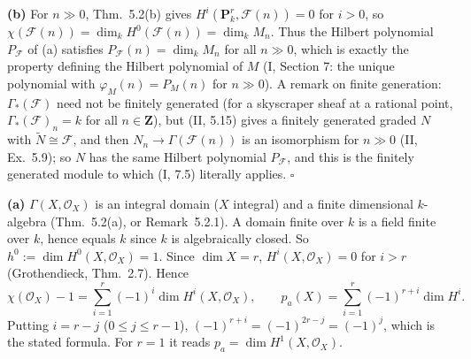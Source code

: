 \documentclass[11pt]{article}
\begin{document}
\textbf{(b)} For $n\gg0$, Thm.~5.2(b) gives $H^i(\mathbf P^r_k,\mathcal F(n))=0$ for $i>0$, so $\chi(\mathcal F(n))=\dim_kH^0(\mathcal F(n))=\dim_kM_n$. Thus the Hilbert polynomial $P_{\mathcal F}$ of (a) satisfies $P_{\mathcal F}(n)=\dim_kM_n$ for all $n\gg0$, which is exactly the property defining the Hilbert polynomial of $M$ (I, Section 7: the unique polynomial with $\varphi_M(n)=P_M(n)$ for $n\gg0$). A remark on finite generation: $\Gamma_*(\mathcal F)$ need not be finitely generated (for a skyscraper sheaf at a rational point, $\Gamma_*(\mathcal F)_n=k$ for all $n\in\mathbf Z$), but (II, 5.15) gives a finitely generated graded $N$ with $\tilde N\cong\mathcal F$, and then $N_n\to\Gamma(\mathcal F(n))$ is an isomorphism for $n\gg0$ (II, Ex.~5.9); so $N$ has the same Hilbert polynomial $P_{\mathcal F}$, and this is the finitely generated module to which (I, 7.5) literally applies. \hfill$\square$

\pf
\textbf{(a)} $\Gamma(X,\mathcal O_X)$ is an integral domain ($X$ integral) and a finite dimensional $k$-algebra (Thm.~5.2(a), or Remark~5.2.1). A domain finite over $k$ is a field finite over $k$, hence equals $k$ since $k$ is algebraically closed. So $h^0:=\dim H^0(X,\mathcal O_X)=1$. Since $\dim X=r$, $H^i(X,\mathcal O_X)=0$ for $i>r$ (Grothendieck, Thm.~2.7). Hence
\[
\chi(\mathcal O_X)-1=\sum_{i=1}^{r}(-1)^i\dim H^i(X,\mathcal O_X),\qquad p_a(X)=\sum_{i=1}^r(-1)^{r+i}\dim H^i.
\]
Putting $i=r-j$ ($0\le j\le r-1$), $(-1)^{r+i}=(-1)^{2r-j}=(-1)^j$, which is the stated formula. For $r=1$ it reads $p_a=\dim H^1(X,\mathcal O_X)$.
\end{document}
